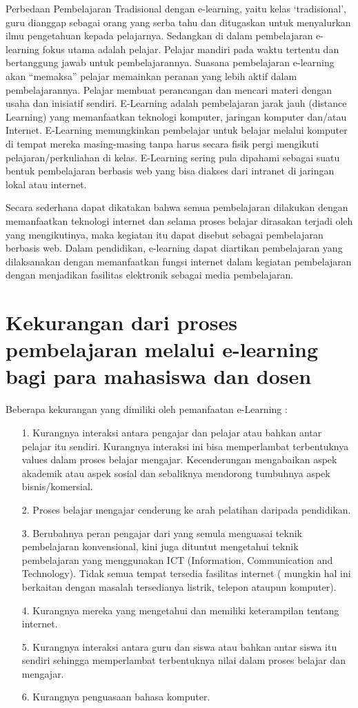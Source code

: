 \documentclass{jtetiproposalskripsi}
\begin{document}
Perbedaan Pembelajaran Tradisional dengan e-learning, yaitu kelas ‘tradisional’, guru dianggap sebagai orang yang serba tahu dan ditugaskan untuk menyalurkan ilmu pengetahuan kepada pelajarnya. Sedangkan di dalam pembelajaran e-learning fokus utama adalah pelajar. Pelajar mandiri pada waktu tertentu dan bertanggung jawab untuk pembelajarannya. Suasana pembelajaran e-learning akan “memaksa” pelajar memainkan peranan yang lebih aktif dalam pembelajarannya. Pelajar membuat perancangan dan mencari materi dengan usaha dan inisiatif sendiri. E-Learning adalah pembelajaran jarak jauh (distance Learning) yang memanfaatkan teknologi komputer, jaringan komputer dan/atau Internet. E-Learning memungkinkan pembelajar untuk belajar melalui komputer di tempat mereka masing-masing tanpa harus secara fisik pergi mengikuti pelajaran/perkuliahan di kelas. E-Learning sering pula dipahami sebagai suatu bentuk pembelajaran berbasis web yang bisa diakses dari intranet di jaringan lokal atau internet.

Secara sederhana dapat dikatakan bahwa semua pembelajaran dilakukan dengan memanfaatkan teknologi internet dan selama proses belajar dirasakan terjadi oleh yang mengikutinya, maka kegiatan itu dapat disebut sebagai pembelajaran berbasis web. Dalam pendidikan, e-learning dapat diartikan pembelajaran yang dilaksanakan dengan memanfaatkan fungsi internet dalam kegiatan pembelajaran dengan menjadikan fasilitas elektronik sebagai media pembelajaran.

\section{Kekurangan dari proses pembelajaran melalui e-learning bagi para mahasiswa dan dosen}
Beberapa kekurangan yang dimiliki oleh pemanfaatan e-Learning :
\begin{itemize}
\item[1.]Kurangnya interaksi antara pengajar dan pelajar atau bahkan antar pelajar itu sendiri. Kurangnya interaksi ini bisa memperlambat terbentuknya values dalam proses belajar mengajar. Kecenderungan mengabaikan aspek akademik atau aspek sosial dan sebaliknya mendorong tumbuhnya aspek bisnis/komersial.
\item[2.]Proses belajar mengajar cenderung ke arah pelatihan daripada pendidikan.
\item[3.]Berubahnya peran pengajar dari yang semula menguasai teknik pembelajaran konvensional, kini juga dituntut mengetahui teknik pembelajaran yang menggunakan ICT (Information, Communication and Technology). Tidak semua tempat tersedia fasilitas internet ( mungkin hal ini berkaitan dengan masalah tersedianya listrik, telepon ataupun komputer).
\item[4.]Kurangnya mereka yang mengetahui dan memiliki keterampilan tentang internet.
\item[5.]Kurangnya interaksi antara guru dan siswa atau bahkan antar siswa itu sendiri sehingga memperlambat terbentuknya nilai dalam proses belajar dan mengajar.
\item[6.]Kurangnya penguasaan bahasa komputer.
\end{itemize}
\end{document}
